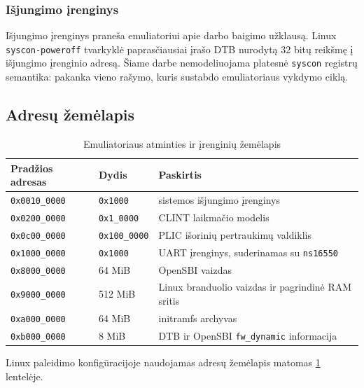 \subsubsection{Išjungimo įrenginys}

Išjungimo įrenginys praneša emuliatoriui apie darbo baigimo užklausą. Linux \texttt{syscon-poweroff} tvarkyklė paprasčiausiai įrašo DTB nurodytą 32 bitų reikšmę į išjungimo įrenginio adresą. Šiame darbe nemodeliuojama platesnė \texttt{syscon} registrų semantika: pakanka vieno rašymo, kuris sustabdo emuliatoriaus vykdymo ciklą.

\subsection{Adresų žemėlapis}


\begin{table}[h]
    \centering
    \begin{tabular}{|l|l|l|}
        \hline
        \textbf{Pradžios adresas} & \textbf{Dydis} & \textbf{Paskirtis} \\
        \hline
        \texttt{0x0010\_0000} & \texttt{0x1000} & sistemos išjungimo įrenginys \\
        \hline
        \texttt{0x0200\_0000} & \texttt{0x1\_0000} & CLINT laikmačio modelis \\
        \hline
        \texttt{0x0c00\_0000} & \texttt{0x100\_0000} & PLIC išorinių pertraukimų valdiklis \\
        \hline
        \texttt{0x1000\_0000} & \texttt{0x1000} & UART įrenginys, suderinamas su \texttt{ns16550} \\
        \hline
        \texttt{0x8000\_0000} & 64 MiB & OpenSBI vaizdas \\
        \hline
        \texttt{0x9000\_0000} & 512 MiB & Linux branduolio vaizdas ir pagrindinė RAM sritis \\
        \hline
        \texttt{0xa000\_0000} & 64 MiB & initramfs archyvas \\
        \hline
        \texttt{0xb000\_0000} & 8 MiB & DTB ir OpenSBI \texttt{fw\_dynamic} informacija \\
        \hline
    \end{tabular}
    \caption{Emuliatoriaus atminties ir įrenginių žemėlapis}
    \label{table:adresu_zemelapis}
\end{table}

Linux paleidimo konfigūracijoje naudojamas adresų žemėlapis matomas \ref{table:adresu_zemelapis} lentelėje.
